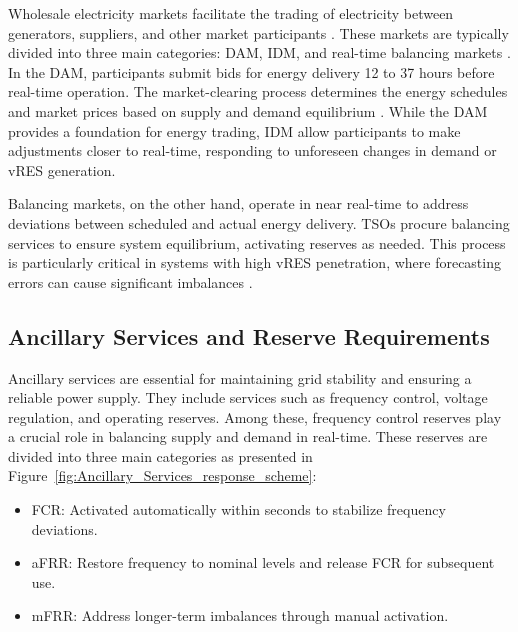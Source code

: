 Wholesale electricity markets facilitate the trading of electricity between generators, suppliers, and other market participants \cite{Hunt:96}. These markets are typically divided into three main categories: \gls{DAM}, \gls{IDM}, and real-time balancing markets \cite{Shahidehpour:02}. In the \gls{DAM}, participants submit bids for energy delivery 12 to 37 hours before real-time operation. The market-clearing process determines the energy schedules and market prices based on supply and demand equilibrium \cite{Kirschen:18}. While the \gls{DAM} provides a foundation for energy trading, \gls{IDM} allow participants to make adjustments closer to real-time, responding to unforeseen changes in demand or \gls{vRES} generation.\par

Balancing markets, on the other hand, operate in near real-time to address deviations between scheduled and actual energy delivery. \gls{TSO}s procure balancing services to ensure system equilibrium, activating reserves as needed. This process is particularly critical in systems with high \gls{vRES} penetration, where forecasting errors can cause significant imbalances \cite{Miettinen:19,Algarvio:19a}.\par

\subsection{Ancillary Services and Reserve Requirements}

Ancillary services are essential for maintaining grid stability and ensuring a reliable power supply. They include services such as frequency control, voltage regulation, and operating reserves. Among these, frequency control reserves play a crucial role in balancing supply and demand in real-time. These reserves are divided into three main categories \cite{Algarvio:19a} as presented in Figure~\ref{fig:Ancillary_Services_response_scheme}:

\begin{itemize}
    \item	\gls{FCR}: Activated automatically within seconds to stabilize frequency deviations.
    \item	\gls{aFRR}: Restore frequency to nominal levels and release FCR for subsequent use.
    \item	\gls{mFRR}: Address longer-term imbalances through manual activation.
\end{itemize}



